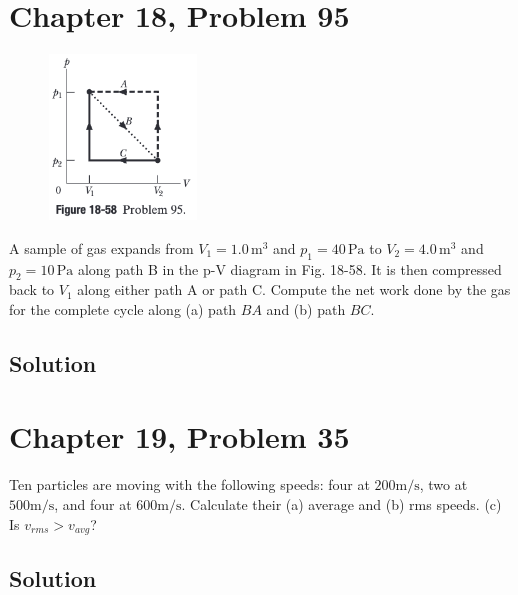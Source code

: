 \documentclass{article}
\begin{document}
    \section{Chapter 18, Problem 95}
        \begin{figure}
            \vspace{-55pt}
            \includegraphics[width=0.35\textwidth]{picture_18-58.png} 
        \end{figure}
        A sample of gas expands from $V_1 = 1.0\,\unit{\meter^3}$ and $p_1 = 40\,\unit{\pascal}$ to $V_2 = 4.0\,\unit{\meter^3}$ and $p_2 = 10\,\unit{\pascal}$ along path B in the p-V diagram in Fig. 18-58.
        It is then compressed back to $V_1$ along either path A or path C. 
        Compute the net work done by the gas for the complete cycle along (a) path $BA$ and (b) path $BC$.

        \subsection{Solution}
    
    \pagebreak
    \section{Chapter 19, Problem 35}
        Ten particles are moving with the following speeds: four at $200 \unit{\meter/\second}$, two at $500 \unit{\meter/\second}$, and four at $600 \unit{\meter/\second}$. 
        Calculate their (a) average and (b) rms speeds. 
        (c) Is $v_{rms} > v_{avg}$?

        \subsection{Solution}

    \pagebreak
\end{document}
